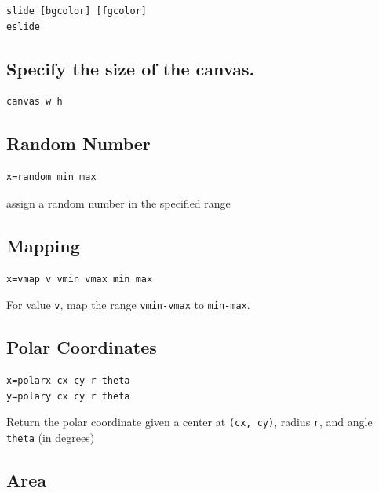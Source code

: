 \begin{verbatim}
slide [bgcolor] [fgcolor]
eslide
\end{verbatim}

\hypertarget{specify-the-size-of-the-canvas.}{%
\subsection{Specify the size of the
canvas.}\label{specify-the-size-of-the-canvas.}}

\begin{verbatim}
canvas w h
\end{verbatim}

\hypertarget{random-number}{%
\subsection{Random Number}\label{random-number}}

\begin{verbatim}
x=random min max
\end{verbatim}

assign a random number in the specified range

\hypertarget{mapping}{%
\subsection{Mapping}\label{mapping}}

\begin{verbatim}
x=vmap v vmin vmax min max
\end{verbatim}

For value \texttt{v}, map the range \texttt{vmin-vmax} to
\texttt{min-max}.

\hypertarget{polar-coordinates}{%
\subsection{Polar Coordinates}\label{polar-coordinates}}

\begin{verbatim}
x=polarx cx cy r theta
y=polary cx cy r theta
\end{verbatim}

Return the polar coordinate given a center at \texttt{(cx,\ cy)}, radius
\texttt{r}, and angle \texttt{theta} (in degrees)

\hypertarget{area}{%
\subsection{Area}\label{area}}

